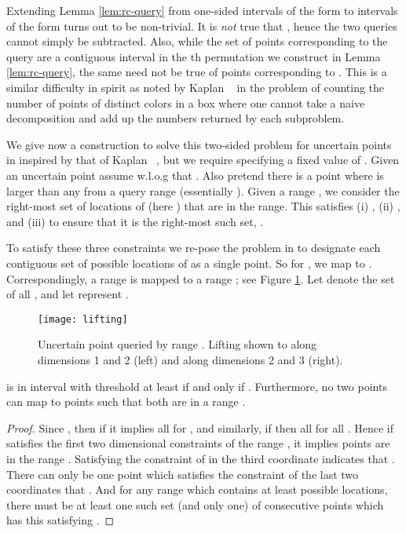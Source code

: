 \documentclass[11pt]{myclass}
\begin{document}
Extending Lemma \ref{lem:rc-query} from one-sided intervals of the form  to intervals of the form  turns out to be non-trivial.  It is \emph{not} true that , hence the two queries cannot simply be subtracted.  Also, while the set of points corresponding to the
query  are a contiguous interval in the th permutation we construct in Lemma \ref{lem:rc-query}, the same need not be true of points corresponding to .
This is a similar difficulty in spirit as noted by Kaplan \etal~\cite{colors} in the problem of counting the number of points of distinct colors in a box where one cannot take a naive decomposition and add up the numbers returned by each subproblem. 

We give now a construction to solve this two-sided problem for uncertain points in  inspired by that of Kaplan \etal~\cite{colors}, but we require specifying a fixed value of .  Given an uncertain point  assume w.l.o.g that .  Also pretend there is a point  where  is larger than any  from a query range  (essentially ).  
Given a range , we consider the right-most set of  locations of  (here ) that are in the range.  This satisfies 
(i) , 
(ii) , and 
(iii) to ensure that it is the right-most such set, .  

To satisfy these three constraints we re-pose the problem in  to designate each contiguous set of  possible locations of  as a single point.  So for , we map  to .  
Correspondingly, a range  is mapped to a range ;  
see Figure \ref{fig:queryreduction}.
Let  denote the set of all , and let  represent .  
 
\begin{figure}[t]
\centering
\texttt{[image: lifting]}
\vspace{-4mm}
\caption{\small Uncertain point  queried by range .  Lifting shown to  along dimensions 1 and 2 (left) and along dimensions 2 and 3 (right).
\vspace{-4mm}
}  

\label{fig:queryreduction}
\end{figure} 
 
\begin{lemma}
 is in interval  with threshold at least  if and only if .
Furthermore, no two points  can map to points  such that both are in a range .  
\end{lemma}
 
\begin{proof}
Since , then if  it implies all  for , and similarly, if  then all  for all .  Hence if  satisfies the first two dimensional constraints of the range , it implies  points  are in the range .  
Satisfying the constraint of  in the third coordinate indicates that .  There can only be one point  which satisfies the constraint of the last two coordinates that .  And for any range which contains at least  possible locations, there must be at least one such set (and only one) of  consecutive points which has this satisfying .  
\end{proof}
\end{document}
